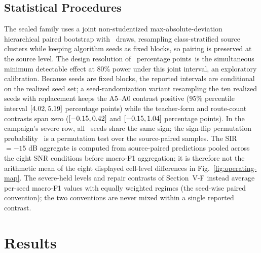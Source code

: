 \documentclass[letterpaper,journal]{IEEEtran}
\newcommand{\pp}{percentage points}
\begin{document}
\subsection{Statistical Procedures}
The sealed family uses a joint non-studentized max-absolute-deviation
hierarchical paired bootstrap with \ProtocolBootstrapDraws\ draws, resampling
class-stratified source clusters while keeping algorithm seeds as fixed
blocks, so pairing is preserved at the source level. The design resolution of
\DesignResolution\ \pp\ is the simultaneous minimum detectable effect at 80\%
power under this joint interval, an exploratory calibration. Because seeds are fixed blocks, the reported
intervals are conditional on the realized seed set; a seed-randomization
variant resampling the ten realized seeds with replacement keeps the A5--A0
contrast positive (95\% percentile interval
$[4.02,5.19]$ \pp) while the teacher-form and
route-count contrasts span zero
($[-0.15,0.42]$ and
$[-0.15,1.04]$ \pp). In the campaign's severe row, all
\SevereGainIqformerPositiveSeeds\ seeds share the same sign; the sign-flip
permutation probability \SevereGainIqformerSignFlipP\ is a permutation test
over the source-paired samples. The SIR $=-15$ dB aggregate is computed from
source-paired predictions pooled across the eight SNR conditions before
macro-F1 aggregation; it is therefore not the arithmetic mean of the eight
displayed cell-level differences in Fig.~\ref{fig:operating-map}. The
severe-held levels and repair contrasts of Section~V-F instead average
per-seed macro-F1 values with equally weighted regimes (the seed-wise paired
convention); the two conventions are never mixed within a single reported
contrast.

\section{Results}
\end{document}
